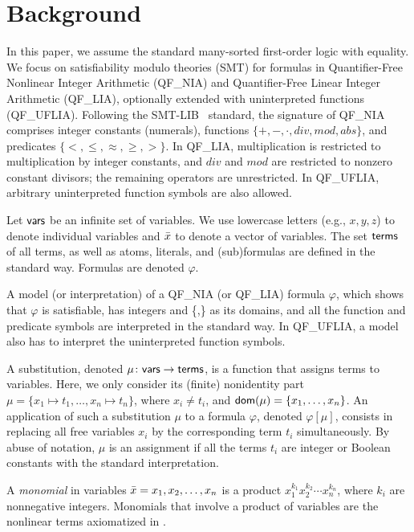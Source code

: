 \section{Background}\label{sec:background}

In this paper, we assume the standard many-sorted first-order logic
with equality. We focus on satisfiability modulo theories (SMT) for
formulas in Quantifier-Free Nonlinear Integer Arithmetic (QF\_NIA) and
Quantifier-Free Linear Integer Arithmetic (QF\_LIA), optionally extended
with uninterpreted functions (QF\_UFLIA). Following the SMT-LIB~\cite{smtlib}
standard, the signature of QF\_NIA comprises integer constants (numerals),
functions $\{+, -, \cdot, \mathit{div}, \mathit{mod}, \mathit{abs}\}$, and
predicates $\{<, \leq, \approx, \geq, >\}$.
In QF\_LIA, multiplication is restricted to multiplication by integer
constants, and $\mathit{div}$ and $\mathit{mod}$ are restricted to nonzero
constant divisors; the remaining operators are unrestricted. In
QF\_UFLIA, arbitrary uninterpreted function symbols are also allowed.

Let $\textsf{vars}$ be an infinite set of variables. We use
lowercase letters (e.g., $x, y, z$) to denote individual
variables and $\bar{x}$ to denote a vector of variables. The set
$\textsf{terms}$ of all terms, as well as atoms, literals, and
(sub)formulas are defined in the standard way. Formulas are
denoted $\varphi$.

A model (or interpretation) of a QF\_NIA (or QF\_LIA) formula $\varphi$, which shows that $\varphi$ is satisfiable,
has integers and \{\TRUE,\FALSE\} as its domains, and all the function and predicate symbols are
interpreted in the standard way. In QF\_UFLIA, a model also has to interpret the uninterpreted function symbols.

A substitution, denoted
$\mu\colon\textsf{vars}\to\textsf{terms}$, is a function that
assigns terms to variables. Here, we only consider its
(finite) nonidentity part
$\mu=\{x_1\mapsto t_1,\dots,x_n\mapsto t_n\}$, where
$x_i\neq t_i$, and $\textsf{dom}(\mu)=\{x_1,\dots,x_n\}$. An
application of such a substitution $\mu$ to a formula
$\varphi$, denoted $\varphi[\mu]$, consists in replacing
all free variables $x_i$ by the corresponding term $t_i$
simultaneously.
By abuse of notation, $\mu$ is an assignment if all the terms $t_i$ are integer or Boolean constants with the standard interpretation.

A \emph{monomial} in variables $\bar{x}=x_1,x_2,\dots,x_n$ is a product
$x_1^{k_1}x_2^{k_2}\cdots x_n^{k_n}$, where $k_i$ are nonnegative integers.
Monomials that involve a product of variables are the nonlinear terms axiomatized in .

